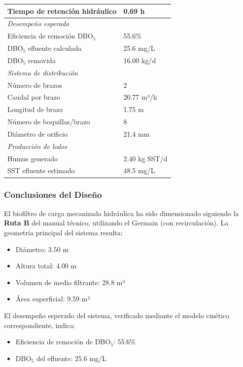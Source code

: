 \documentclass[12pt,a4paper]{article}
\begin{document}
\begin{longtable}{ll}
Tiempo de retención hidráulico & 0.69 h \\
\midrule
\multicolumn{2}{l}{\textit{Desempeño esperado}} \\
Eficiencia de remoción DBO$_5$ & 55.6\% \\
DBO$_5$ efluente calculada & 25.6 mg/L \\
DBO$_5$ removida & 16.00 kg/d \\
\midrule
\multicolumn{2}{l}{\textit{Sistema de distribución}} \\
Número de brazos & 2 \\
Caudal por brazo & 20.77 m³/h \\
Longitud de brazo & 1.75 m \\
Número de boquillas/brazo & 8 \\
Diámetro de orificio & 21.4 mm \\
\midrule
\multicolumn{2}{l}{\textit{Producción de lodos}} \\
Humus generado & 2.40 kg SST/d \\
SST efluente estimado & 48.5 mg/L \\
\end{longtable}
\endgroup

\subsubsection*{Conclusiones del Diseño}

El biofiltro de carga mecanizada hidráulica ha sido dimensionado siguiendo la \textbf{Ruta B} del manual técnico, utilizando el Germain (con recirculación). La geometría principal del sistema resulta:

\begin{itemize}[noitemsep,leftmargin=2em]
    \item Diámetro: 3.50 m
    \item Altura total: 4.00 m
    \item Volumen de medio filtrante: 28.8 m³
    \item Área superficial: 9.59 m²
\end{itemize}

El desempeño esperado del sistema, verificado mediante el modelo cinético correspondiente, indica:

\begin{itemize}[noitemsep,leftmargin=2em]
    \item Eficiencia de remoción de DBO$_5$: 55.6\%
    \item DBO$_5$ del efluente: 25.6 mg/L

\end{itemize}
\end{document}
